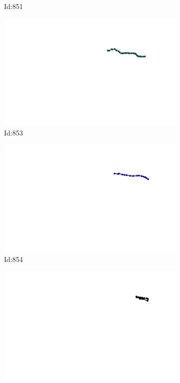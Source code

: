 \documentclass[12pt,twoside]{report}
\begin{document}
\begin{figure}
\begin{subfigure}[b]{0.20\textwidth}
\caption{Id:851}
\end{subfigure}
\begin{subfigure}[b]{0.20\textwidth}
\centering
\includegraphics[width=\textwidth]{../trajectories/853.png}
\caption{Id:853}
\end{subfigure}
\begin{subfigure}[b]{0.20\textwidth}
\centering
\includegraphics[width=\textwidth]{../trajectories/854.png}
\caption{Id:854}
\end{subfigure}
\begin{subfigure}[b]{0.20\textwidth}
\centering
\includegraphics[width=\textwidth]{../trajectories/857.png}

\end{subfigure}
\end{figure}
\end{document}

